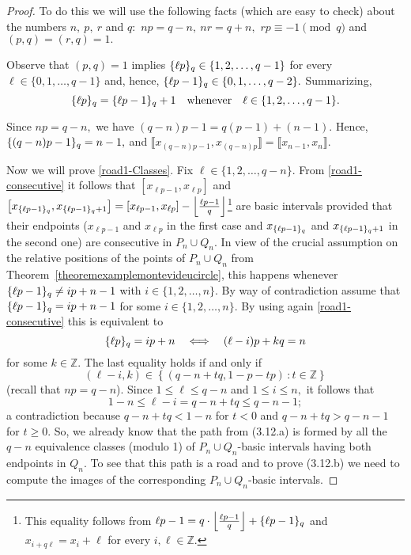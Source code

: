 \documentclass[a4paper, 11pt]{amsart}
\numberwithin{equation}{section}
\theoremstyle{customnumberedtheorem}
\theoremstyle{definitionwithbfnote}
\newcommand{\Z}{\ensuremath{\mathbb{Z}}}
\newcommand{\set}[2]{\ensuremath{\left\{#1 \,\colon #2\right\}}}
\newcommand{\floor}[1]{\ensuremath{\left\lfloor #1 \right\rfloor}}
\newcommand{\bigBIclass}[1]{\ensuremath{\bigl\llbracket #1\bigr\rrbracket}}
\newcommand{\andq}[1][and]{\ensuremath{\quad\text{#1}\quad}}
\newcommand{\modulo}[2]{\{#1\}\sb{#2}}
\begin{document}
\begin{proof}
To do this we will use the following facts (which are easy to check)
about the numbers $n, \ p,\ r$ and $q:$
$np = q-n,\ nr = q + n,$
$rp \equiv -1 \pmod{q}$ and
$(p,q) = (r,q) = 1.$

Observe that $(p,q) = 1$ implies
$\modulo{\ell p}{q} \in \{1,2,\dots,q-1\}$
for every $\ell \in \{0,1,\dots,q-1\}$
and, hence,
$\modulo{\ell p - 1}{q} \in \{0,1,\dots,q-2\}.$
Summarizing,
\begin{equation}\label{road1-consecutive}
\modulo{\ell p}{q} =
\modulo{\ell p-1}{q} + 1 \andq[whenever] \ell \in \{1,2,\dots,q-1\}.
\end{equation}

Since $np = q-n,$ we have
$(q-n)p - 1 = q(p-1) + (n-1).$ %
Hence, $\modulo{(q-n)p - 1}{q} = n-1,$ and
$\bigBIclass{x_{(q-n)p-1},x_{(q-n)p}} = \bigBIclass{x_{n-1},x_{n}}.$
\smallskip

Now we will prove \eqref{road1-Classes}.
Fix $\ell \in \{1,2,\dots,q-n\}.$
From \eqref{road1-consecutive} it follows that
$\left[x_{\ell p-1}, x_{\ell p}\right]$ and
$
  \left[x_{\modulo{\ell p-1}{q}}, x_{\modulo{\ell p-1}{q}+1}\right] =
  \left[x_{\ell p-1}, x_{\ell p}\right] -
        \floor{\tfrac{\ell p-1}{q}}
$\footnote{This equality follows from
$\ell p-1 = q\cdot \floor{\tfrac{\ell p-1}{q}} + \modulo{\ell p-1}{q}$
and $x_{i + q\ell} = x_i + \ell$ for every $i,\ell \in \Z$.}
are basic intervals provided that their endpoints
($x_{\ell p-1}$ and $x_{\ell p}$ in the first case and
 $x_{\modulo{\ell p-1}{q}}$ and $x_{\modulo{\ell p-1}{q}+1}$ in the second one)
are consecutive in $P_n \cup Q_n.$
In view of the crucial assumption on the relative positions
of the points of $P_n \cup Q_n$ from
Theorem~\ref{theoremexamplemontevideucircle},
this happens whenever
$\modulo{\ell p-1}{q} \neq i p + n-1$ with $i\in\{1,2,\dots,n\}.$
By way of contradiction assume that
$\modulo{\ell p-1}{q} = i p + n-1$ for some $i\in\{1,2,\dots,n\}.$
By using again \eqref{road1-consecutive} this is equivalent to
\[
 \modulo{\ell p}{q} = i p + n
    \quad\Longleftrightarrow\quad
 (\ell - i) p + kq = n
\]
for some $k\in \Z.$
The last equality holds if and only if
\[
    (\ell -i, k) \in \set{(q-n+tq, 1-p-tp)}{t \in \Z}
\]
(recall that $np = q-n$).
Since $1 \le \ell \le q-n$ and $1 \le i \le n,$
it follows that
\[
  1-n \le \ell - i = q-n+tq \le q-n-1;
\]
a contradiction because
$q-n+tq < 1-n$ for $t < 0$ and
$q-n+tq > q-n-1$ for $t \ge 0.$
So, we already know that the path from (3.12.a) is formed
by all the $q-n$ equivalence classes (modulo 1) of
$P_n \cup Q_n$-basic intervals having both endpoints in $Q_n.$
To see that this path is a road and to prove (3.12.b)
we need to compute the images of the corresponding
$P_n \cup Q_n$-basic intervals.


\end{proof}
\end{document}
